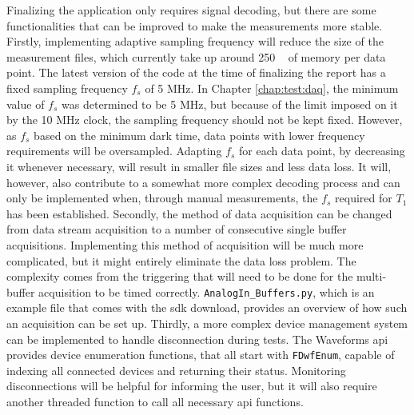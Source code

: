 Finalizing the application only requires signal decoding, but there are some functionalities that can be improved to make the measurements more stable. Firstly, implementing adaptive sampling frequency will reduce the size of the measurement files, which currently take up around 250 \unit{\mega\byte} of memory per data point. The latest version of the code at the time of finalizing the report has a fixed sampling frequency $f_s$ of 5 \unit{\mega\hertz}. In Chapter \ref{chap:test:daq}, the minimum value of $f_s$ was determined to be 5 \unit{\mega\hertz}, but because of the limit imposed on it by the 10 \unit{\mega\hertz} clock, the sampling frequency should not be kept fixed. However, as $f_s$ based on the minimum dark time, data points with lower frequency requirements will be oversampled. Adapting $f_s$ for each data point, by decreasing it whenever necessary, will result in smaller file sizes and less data loss. It will, however, also contribute to a somewhat more complex decoding process and can only be implemented when, through manual measurements, the $f_s$ required for $T_1$ has been established. Secondly, the method of data acquisition can be changed from data stream acquisition to a number of consecutive single buffer acquisitions. Implementing this method of acquisition will be much more complicated, but it might entirely eliminate the data loss problem. The complexity comes from the triggering that will need to be done for the multi-buffer acquisition to be timed correctly. \lstinline|AnalogIn_Buffers.py|, which is an example file that comes with the \gls{sdk} download, provides an overview of how such an acquisition can be set up. Thirdly, a more complex device management system can be implemented to handle disconnection during tests. The Waveforms \gls{api} provides device enumeration functions, that all start with \lstinline|FDwfEnum|, capable of indexing all connected devices and returning their status. Monitoring disconnections will be helpful for informing the user, but it will also require another threaded function to call all necessary \gls{api} functions.

